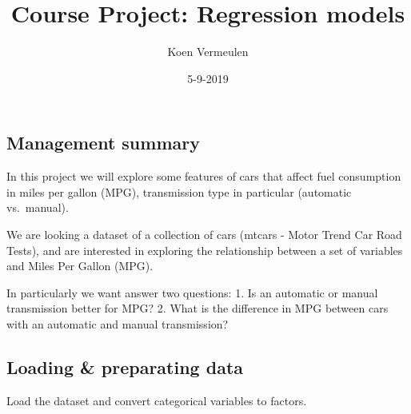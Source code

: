\documentclass[]{article}
\title{Course Project: Regression models}
\author{Koen Vermeulen}
\date{5-9-2019}
\begin{document}
\maketitle

\subsection{Management summary}\label{management-summary}

In this project we will explore some features of cars that affect fuel
consumption in miles per gallon (MPG), transmission type in particular
(automatic vs.~manual).

We are looking a dataset of a collection of cars (mtcars - Motor Trend
Car Road Tests), and are interested in exploring the relationship
between a set of variables and Miles Per Gallon (MPG).

In particularly we want answer two questions: 1. Is an automatic or
manual transmission better for MPG? 2. What is the difference in MPG
between cars with an automatic and manual transmission?

\subsection{Loading \& preparating data}\label{loading-preparating-data}

Load the dataset and convert categorical variables to factors.
\end{document}
